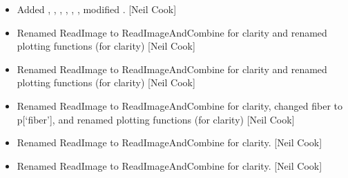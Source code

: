\documentclass[a4paper,10pt,english]{report}
\begin{document}
\begin{itemize}
\item {} 
Added , , ,
, , , modified
. {[}Neil Cook{]}

\item {} 
Renamed ReadImage to ReadImageAndCombine for clarity and renamed
plotting functions (for clarity) {[}Neil Cook{]}

\item {} 
Renamed ReadImage to ReadImageAndCombine for clarity and renamed
plotting functions (for clarity) {[}Neil Cook{]}

\item {} 
Renamed ReadImage to ReadImageAndCombine for clarity, changed fiber to
p{[}‘fiber’{]}, and renamed plotting functions (for clarity) {[}Neil Cook{]}

\item {} 
Renamed ReadImage to ReadImageAndCombine for clarity. {[}Neil Cook{]}

\item {} 
Renamed ReadImage to ReadImageAndCombine for clarity. {[}Neil Cook{]}

\end{itemize}
\end{document}
